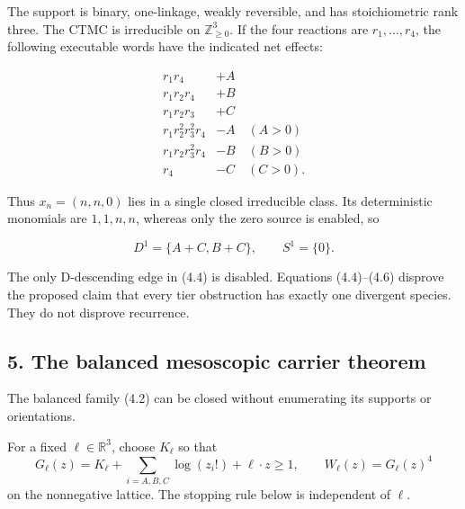 The support is binary, one-linkage, weakly reversible, and has
stoichiometric rank three. The CTMC is irreducible on
\(\mathbb Z_{\ge0}^3\). If the four reactions are \(r_1,\ldots,r_4\),
the following executable words have the indicated net effects:

\[
\begin{array}{c|c}
r_1r_4&+A\\
r_1r_2r_4&+B\\
r_1r_2r_3&+C\\
r_1r_2^2r_3^2r_4&-A\quad(A>0)\\
r_1r_2r_3^2r_4&-B\quad(B>0)\\
r_4&-C\quad(C>0).
\end{array}                                                     \tag{4.5}
\]

Thus \(x_n=(n,n,0)\) lies in a single closed irreducible class. Its
deterministic monomials are \(1,1,n,n\), whereas only the zero source is
enabled, so

\[
          D^1=\{A+C,B+C\},\qquad S^1=\{0\}.                    \tag{4.6}
\]

The only D-descending edge in (4.4) is disabled. Equations (4.4)--(4.6)
disprove the proposed claim that every tier obstruction has exactly one
divergent species. They do not disprove recurrence.

\subsection{5. The balanced mesoscopic carrier
theorem}

The balanced family (4.2) can be closed without enumerating its supports
or orientations.

For a fixed \(\ell\in\mathbb R^3\), choose \(K_\ell\) so that \[
 G_\ell(z)=K_\ell+\sum_{i=A,B,C}\log(z_i!)+\ell\cdot z\ge1,
 \qquad W_\ell(z)=G_\ell(z)^4                              \tag{5.0}
\] on the nonnegative lattice. The stopping rule below is independent of
\(\ell\).

